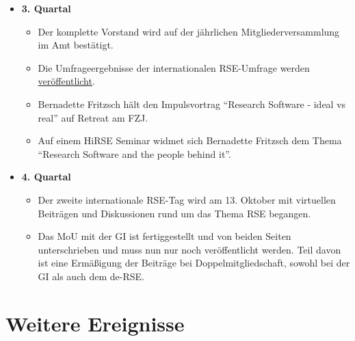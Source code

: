 \begin{itemize}
\begin{itemize}
   \end{itemize}
 \item \textbf{3. Quartal}
   \begin{itemize}

    \item Der komplette Vorstand wird auf der jährlichen Mitgliederversammlung im Amt bestätigt.
    \item Die Umfrageergebnisse der internationalen RSE-Umfrage werden \href{https://softwaresaved.github.io/international-survey-2022/}{veröffentlicht}.
    \item Bernadette Fritzsch hält den Impulsvortrag "`Research Software - ideal vs real"' auf Retreat am FZJ.
    \item Auf einem HiRSE Seminar widmet sich Bernadette Fritzsch dem Thema "`Research Software and the people behind it"'.

   \end{itemize}
 \item \textbf{4. Quartal}
   \begin{itemize}
    \item Der zweite internationale RSE-Tag wird am 13. Oktober mit virtuellen Beiträgen und Diskussionen rund um das Thema RSE begangen.
    \item Das MoU mit der GI ist fertiggestellt und von beiden Seiten unterschrieben und muss nun nur noch veröffentlicht werden. Teil davon ist eine Ermäßigung der Beiträge bei Doppelmitgliedschaft, sowohl bei der GI als auch dem de-RSE.
   \end{itemize}
\end{itemize}
\clearpage
\section{Weitere Ereignisse}


